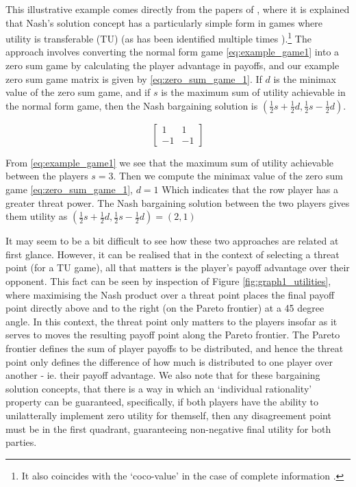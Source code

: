 This illustrative example comes directly from the papers of \cite{value2,value1}, where it is explained that Nash's solution concept has a particularly simple form in games where utility is transferable (TU) (as has been identified multiple times \cite{value2,shap_lectures,value1}).\footnote{It also coincides with the `coco-value' in the case of complete information \citep{kalai1,Kalai2010}.}
The approach involves converting the normal form game \eqref{eq:example_game1} into a zero sum game by calculating the player advantage in payoffs, and our example zero sum game matrix is given by \eqref{eq:zero_sum_game_1}.
If $d$ is the minimax value of the zero sum game, and if $s$ is the maximum sum of utility achievable in the normal form game, then the Nash bargaining solution is $(\frac{1}{2}s+\frac{1}{2}d,\frac{1}{2}s-\frac{1}{2}d)$.

\begin{equation}\label{eq:zero_sum_game_1} \begin{bmatrix}1 & 1\\ -1 & -1\end{bmatrix} \end{equation}

\begin{solution}[TU approach]
From \eqref{eq:example_game1} we see that the maximum sum of utility achievable between the players $s=3$. Then we compute the minimax value of the zero sum game \eqref{eq:zero_sum_game_1}, $d=1$ Which indicates that the row player has a greater threat power.
The Nash bargaining solution between the two players gives them utility as $(\frac{1}{2}s+\frac{1}{2}d,\frac{1}{2}s-\frac{1}{2}d) = (2,1)$
\end{solution}

It may seem to be a bit difficult to see how these two approaches are related at first glance.
However, it can be realised that in the context of selecting a threat point (for a TU game), all that matters is the player's payoff advantage over their opponent.
This fact can be seen by inspection of Figure \ref{fig:graph1_utilities}, where maximising the Nash product over a threat point places the final payoff point directly above and to the right (on the Pareto frontier) at a 45 degree angle.
In this context, the threat point only matters to the players insofar as it serves to moves the resulting payoff point along the Pareto frontier.
The Pareto frontier defines the sum of player payoffs to be distributed, and hence the threat point only defines the difference of how much is distributed to one player over another - ie. their payoff advantage. We also note that for these bargaining solution concepts, that there is a way in which an `individual rationality' property can be guaranteed, specifically, if both players have the ability to unilatterally implement zero utility for themself, then any disagreement point must be in the first quadrant, guaranteeing non-negative final utility for both parties.

